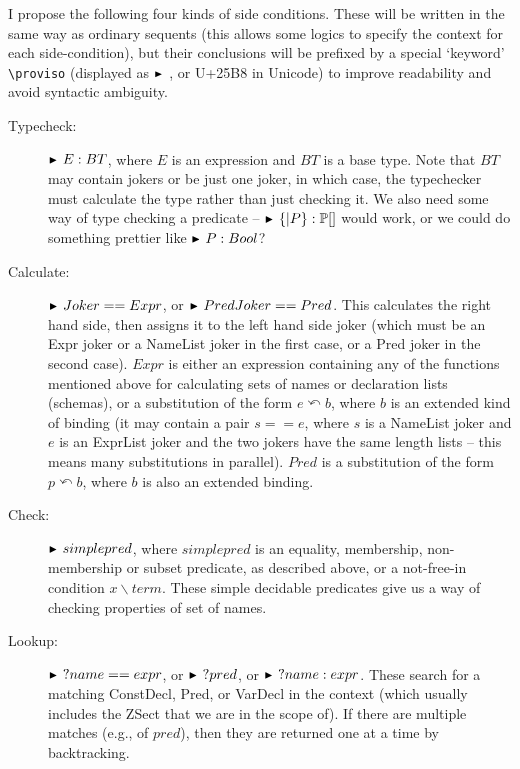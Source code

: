 \documentclass{article}
\newcommand{\notfreein}{\mathbin{\backslash}}
\newcommand{\substitute}{\mathrel{\curvearrowleft}}  %
\newcommand{\proviso}{\raisebox{0.5ex}{${}_{\blacktriangleright}\ $}}%
\begin{document}
I propose the following four kinds of side conditions.
These will be written in the same way as ordinary sequents
(this allows some logics to specify the context for each
side-condition), but their conclusions will be prefixed by
a special `keyword' \verb!\proviso! (displayed as $\proviso$,
or U+25B8 in Unicode) to improve readability and avoid syntactic ambiguity.
\begin{description}
\item[Typecheck:] $\proviso E:BT$, where $E$ is an expression and $BT$
  is a base type.  Note that $BT$ may contain jokers or be just one 
  joker, in which case, the typechecker must calculate the type rather
  than just checking it.  We also need some way of type checking
  a predicate -- $\proviso \{|P\}:\power []$ would work, or we
  could do something prettier like $\proviso P:Bool$?
\item[Calculate:] $\proviso Joker == Expr$, or $\proviso PredJoker==Pred$.
  This calculates the right hand side, then assigns it to the left hand
  side joker (which must be an Expr joker or a NameList joker
  in the first case, or a Pred joker in the second case).
  $Expr$ is either an expression containing any of the functions mentioned
  above for calculating sets of names or declaration lists (schemas),
  or a substitution of the form $e \substitute b$, where $b$ is an
  extended kind of binding (it may contain a pair $s==e$, where $s$
  is a NameList joker and $e$ is an ExprList joker and the two
  jokers have the same length lists -- this means many substitutions
  in parallel).
  $Pred$ is a substitution of the form $p \substitute b$, where
  $b$ is also an extended binding.
\item[Check:] $\proviso simplepred$, where $simplepred$ is an
  equality, membership, non-membership or subset predicate, as
  described above, or a not-free-in condition $x \notfreein term$.
  These simple decidable predicates give us a
  way of checking properties of set of names.
\item[Lookup:] $\proviso? name==expr$, or $\proviso? pred$, or
  $\proviso? name:expr$.  These search for a matching ConstDecl,
  Pred, or VarDecl in the context (which usually includes the ZSect
  that we are in the scope of).  If there are multiple matches
  (e.g., of $pred$), then they are returned one at a time by backtracking.


\end{description}
\end{document}

